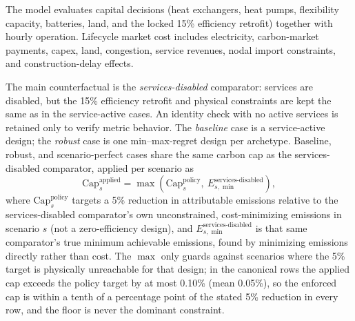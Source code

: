 \documentclass[preprint,12pt]{elsarticle}
\begin{document}
The model evaluates capital decisions (heat exchangers, heat pumps, flexibility capacity, batteries, land, and the locked 15\% efficiency retrofit) together with hourly operation. Lifecycle market cost includes electricity, carbon-market payments, capex, land, congestion, service revenues, nodal import constraints, and construction-delay effects.

The main counterfactual is the \emph{services-disabled} comparator: services are disabled, but the 15\% efficiency retrofit and physical constraints are kept the same as in the service-active cases. An identity check with no active services is retained only to verify metric behavior. The \emph{baseline} case is a service-active design; the \emph{robust} case is one min--max-regret design per archetype. Baseline, robust, and scenario-perfect cases share the same carbon cap as the services-disabled comparator, applied per scenario as
\begin{equation}
\text{Cap}^{\text{applied}}_s = \max\left(\text{Cap}^{\text{policy}}_s,\ E^{\text{services-disabled}}_{s,\min}\right),
\label{eq:carbon-cap-floor}
\end{equation}
where $\text{Cap}^{\text{policy}}_s$ targets a 5\% reduction in attributable emissions relative to the services-disabled comparator's own unconstrained, cost-minimizing emissions in scenario $s$ (not a zero-efficiency design), and $E^{\text{services-disabled}}_{s,\min}$ is that same comparator's true minimum achievable emissions, found by minimizing emissions directly rather than cost. The $\max$ only guards against scenarios where the 5\% target is physically unreachable for that design; in the canonical rows the applied cap exceeds the policy target by at most 0.10\% (mean 0.05\%), so the enforced cap is within a tenth of a percentage point of the stated 5\% reduction in every row, and the floor is never the dominant constraint.
\end{document}
